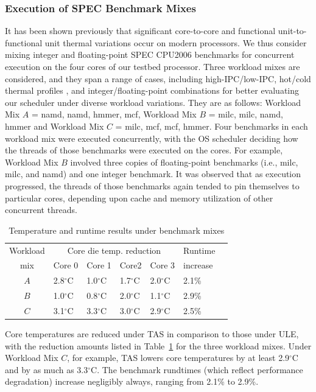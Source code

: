 \documentclass[times, 10pt,twocolumn]{IEEEtran}
\begin{document}
\subsubsection{Execution of SPEC Benchmark Mixes}
\label{sec:cross-funct-unit} 
It has been shown previously \cite{Choi2007,Cher2011} that significant
core-to-core and functional unit-to-functional unit thermal variations
occur on modern processors.  We thus consider mixing integer and
floating-point SPEC CPU2006 benchmarks for concurrent execution on the
four cores of our testbed processor.  Three workload mixes are
considered, and they span a range of cases, including high-IPC/low-IPC,
hot/cold thermal profiles \cite{Kursun2008}, and integer/floating-point
combinations for better evaluating our scheduler under diverse workload variations.
They are as follows: Workload Mix $A$ = {namd, namd, hmmer, mcf}, 
Workload Mix $B$ = {milc, milc, namd, hmmer} and
Workload Mix $C$ = {milc, mcf, mcf, hmmer}.
Four benchmarks in each workload mix were executed concurrently,
with the OS scheduler deciding how the threads of those benchmarks 
were executed on the cores.
For example, Workload Mix $B$ involved three copies of floating-point
benchmarks (i.e., milc, milc, and namd) and one integer benchmark.
It was observed that as execution progressed, the
threads of those benchmarks again tended to pin themselves to particular
cores, depending upon cache and memory utilization of other concurrent
threads.

\begin{small}
\begin{table}[!bp] 
\centering
\caption{Temperature and runtime results under benchmark mixes}
\label{tab:mixwkload}
\begin{tabular}{cllllll} 
\hline
\hline
Workload & \multicolumn{4}{c}{Core die temp. reduction} & Runtime\\
 mix & Core 0 & Core 1 & Core2  & Core 3 & increase \\
\hline
$A$ & 2.8$^{\circ}$C & 1.0$^{\circ}$C & 1.7$^{\circ}$C & 2.0$^{\circ}$C & 2.1\% \\
$B$ & 1.0$^{\circ}$C & 0.8$^{\circ}$C & 2.0$^{\circ}$C & 1.1$^{\circ}$C & 2.9\% \\
$C$ & 3.1$^{\circ}$C & 3.3$^{\circ}$C & 3.0$^{\circ}$C & 2.9$^{\circ}$C & 2.5\% \\
\hline
\end{tabular}
\end{table}
\end{small} 

Core temperatures are reduced under TAS in comparison to those under ULE, with the
reduction amounts listed in Table~\ref{tab:mixwkload} for the three
workload mixes.  Under Workload Mix $C$, for example, TAS lowers core temperatures
by at least 2.9$^{\circ}$C and by as much as 3.3$^{\circ}$C.  
The benchmark rundtimes (which reflect performance degradation) increase
negligibly always, ranging from 2.1\% to 2.9\%.
\end{document}
